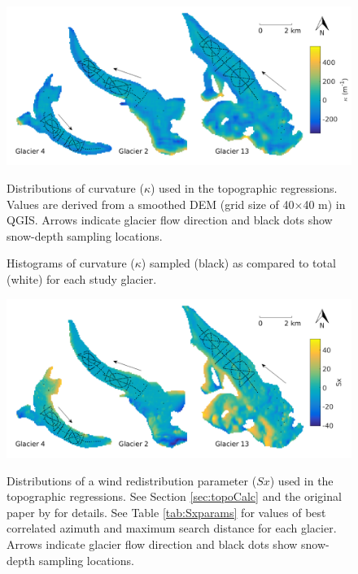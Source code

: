 \documentclass{sfuthesis}
\newcommand{\topomap}{Arrows indicate glacier flow direction and black dots show snow-depth sampling locations. }
\begin{document}
{\begin{figure}[H]
	\centering
	\includegraphics[width=\textwidth]{Map_curvature.png}\\
	\caption[Distributions of curvature ($\kappa$)]{Distributions of curvature ($\kappa$) used in the topographic regressions. Values are derived from a smoothed DEM (grid size of 40$\times$40 m) in QGIS. \topomap}
	\label{map:curvature}
\end{figure}

\begin{figure}[H]
	\caption[Histograms of full and sampled curvature ($\kappa$) ]{Histograms of curvature ($\kappa$) sampled (black) as compared to total (white) for each study glacier.}
	\label{sampledRange:curvature}
\end{figure}

\begin{figure}[H]
	\centering
	\includegraphics[width=\textwidth]{Map_Sx.png}\\
	\caption[Distributions of a wind redistribution parameter ($Sx$)]{Distributions of a wind redistribution parameter ($Sx$) used in the topographic regressions. See Section \ref{sec:topoCalc} and the original paper by \cite{Winstral2002} for details. See Table \ref{tab:Sxparams} for values of best correlated azimuth and maximum search distance for each glacier. \topomap }
	\label{map:Sx}
\end{figure}

}
\end{document}
